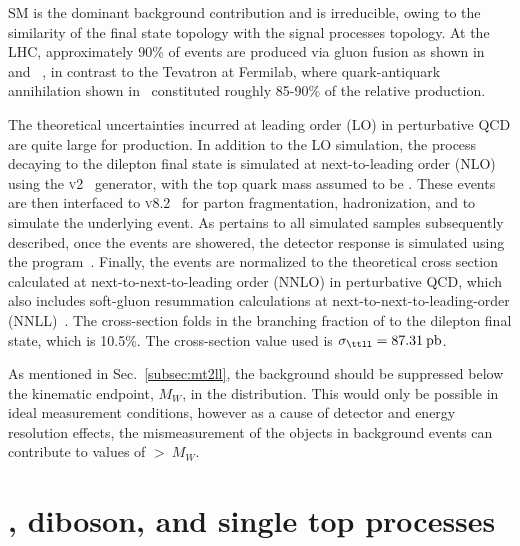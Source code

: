 SM \ttll is the dominant background contribution and is irreducible, owing to the similarity of the final state topology with the signal processes topology. At the LHC, approximately 90\% of \ttbar events are produced via gluon fusion as shown in~ and ~, in contrast to the Tevatron at Fermilab, where quark-antiquark annihilation shown in~ constituted roughly 85-90\% of the relative \ttbar production. 

The theoretical uncertainties incurred at leading order (LO) in perturbative QCD are quite large for \ttbar production. In addition to the LO simulation, the \ttbar process decaying to the dilepton final state is simulated at next-to-leading order (NLO) using the \POWHEG \textsc{v2}~\cite{powheg,powheg2} generator, with the top quark mass assumed to be \:\GeV. These events are then interfaced to \Pythia \textsc{v8.2}~\cite{Sjostrand:2014zea} for parton fragmentation, hadronization, and to simulate the underlying event. As pertains to all simulated samples subsequently described, once the \ttll events are showered, the detector response is simulated using the  program~\cite{AGOSTINELLI2003250}. Finally, the \ttll events are normalized to the theoretical cross section calculated at next-to-next-to-leading order (NNLO) in perturbative QCD, which also includes soft-gluon resummation calculations at next-to-next-to-leading-order (NNLL)~\cite{ttxsec1,ttxsec2,ttxsec3,ttxsec4,ttxsec5}. The cross-section folds in the branching fraction of \ttbar to the dilepton final state, which is 10.5\%. The cross-section value used is $\sigma_{\ttll}=87.31\:\mathrm{pb}$.

As mentioned in Sec.~\ref{subsec:mt2ll}, the \ttll background should be suppressed below the kinematic endpoint, $M_W$, in the \mttll distribution. This would only be possible in ideal measurement conditions, however as a cause of detector and energy resolution effects, the mismeasurement of the objects in \ttll background events can contribute to values of \mttll$>\:M_W$. 

\section{\ttV, diboson, and single top processes}

